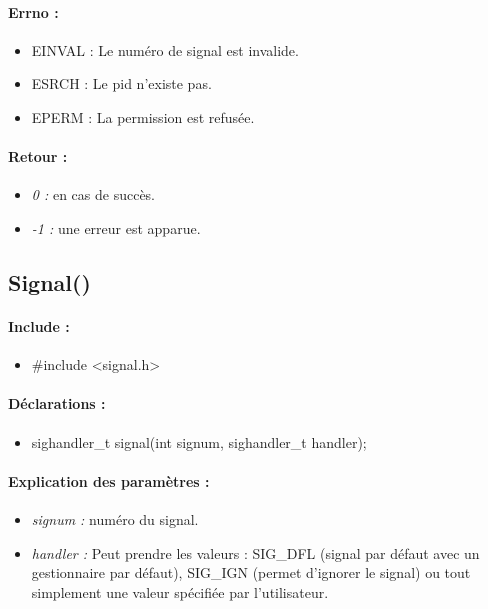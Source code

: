 \documentclass{article}[12pt]
\begin{document}
\paragraph{Errno :}
\begin{itemize}
	\item EINVAL : Le numéro de signal est invalide.
    \item ESRCH : Le pid n'existe pas.
    \item EPERM : La permission est refusée.
\end{itemize}
\paragraph{Retour : }
\begin{itemize}
	\item \emph{0 : } en cas de succès.
	\item \emph{-1 : } une erreur est apparue.
\end{itemize}
\subsection{Signal()}
\paragraph{Include : }
\begin{itemize}
	\item \#include <signal.h>
\end{itemize}
\paragraph{Déclarations : }
\begin{itemize}
	\item sighandler\_t signal(int signum, sighandler\_t handler);
\end{itemize}
\paragraph{Explication des paramètres : }
\begin{itemize}
	\item \emph{signum : } numéro du signal.
	\item \emph{handler : } Peut prendre les valeurs : SIG\_DFL (signal par défaut avec un gestionnaire par défaut), SIG\_IGN (permet d'ignorer le signal) ou tout simplement une valeur spécifiée par l'utilisateur.
\end{itemize}
\end{document}
